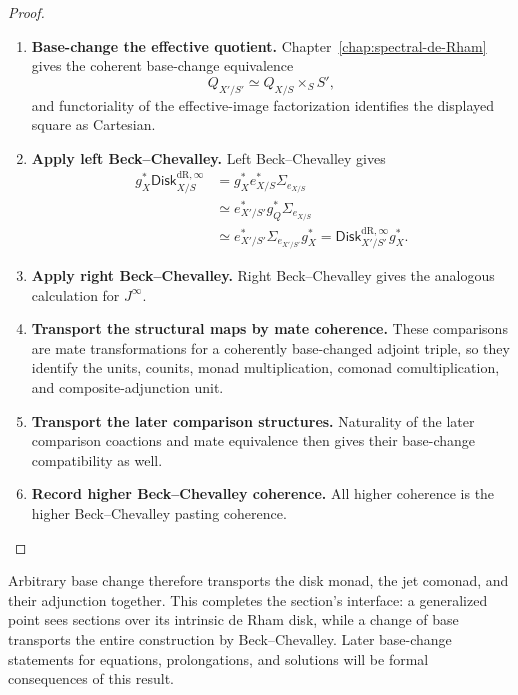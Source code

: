 \begin{proof}
\leavevmode
\begin{enumerate}[label=\textup{(\arabic*)}]
    \item \textbf{Base-change the effective quotient.}
Chapter~\ref{chap:spectral-de-Rham} gives the coherent base-change equivalence
\[
  Q_{X'/S'}\simeq Q_{X/S}\times_SS',
\]
and functoriality of the effective-image factorization identifies the displayed
square as Cartesian.

    \item \textbf{Apply left Beck--Chevalley.}
Left Beck--Chevalley gives
\[
\begin{aligned}
  g_X^*\mathsf{Disk}^{\mathrm{dR},\infty}_{X/S}
  &=
  g_X^*e_{X/S}^*\Sigma_{e_{X/S}}\\
  &\simeq
  e_{X'/S'}^*g_Q^*\Sigma_{e_{X/S}}\\
  &\simeq
  e_{X'/S'}^*\Sigma_{e_{X'/S'}}g_X^*
  =
  \mathsf{Disk}^{\mathrm{dR},\infty}_{X'/S'}g_X^*.
\end{aligned}
\]

    \item \textbf{Apply right Beck--Chevalley.}
Right Beck--Chevalley gives the analogous calculation for \(J^\infty\).

    \item \textbf{Transport the structural maps by mate coherence.}
These
comparisons are mate transformations for a coherently base-changed adjoint
triple, so they identify the units, counits, monad multiplication,
comonad comultiplication, and composite-adjunction unit.

    \item \textbf{Transport the later comparison structures.}
Naturality of the
later comparison coactions and mate equivalence then gives their base-change
compatibility as well.

    \item \textbf{Record higher Beck--Chevalley coherence.}
All higher coherence is the higher Beck--Chevalley
pasting coherence.
\end{enumerate}
\end{proof}

Arbitrary base change therefore transports the disk monad, the jet comonad, and
their adjunction together. This completes the section's interface: a
generalized point sees sections over its intrinsic de Rham disk, while a
change of base transports the entire construction by Beck--Chevalley. Later
base-change statements for equations, prolongations, and solutions will be
formal consequences of this result.

